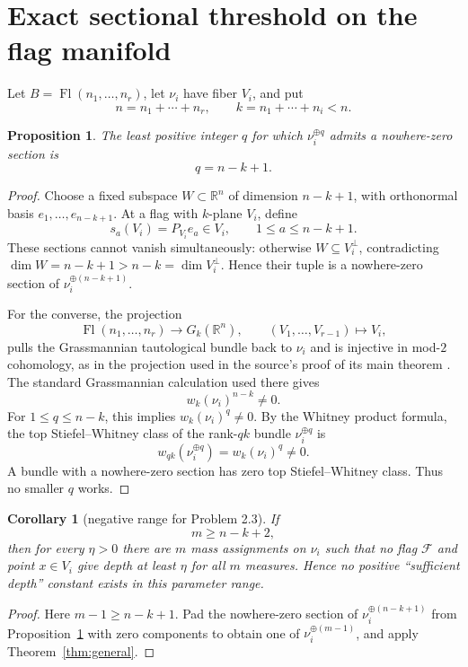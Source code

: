 \documentclass[11pt]{article}
\newtheorem{proposition}{Proposition}
\newtheorem{corollary}{Corollary}
\newcommand{\R}{\mathbb R}
\newcommand{\Fl}{\operatorname{Fl}}
\begin{document}
\section{Exact sectional threshold on the flag manifold}

Let $B=\Fl(n_1,\ldots,n_r)$, let $\nu_i$ have fiber $V_i$, and put
\[
 n=n_1+\cdots+n_r,
 \qquad k=n_1+\cdots+n_i<n.
\]

\begin{proposition}\label{prop:threshold}
The least positive integer $q$ for which $\nu_i^{\oplus q}$ admits a
nowhere-zero section is
\[
 q=n-k+1.
\]
\end{proposition}

\begin{proof}
Choose a fixed subspace $W\subset\R^n$ of dimension $n-k+1$, with orthonormal
basis $e_1,\ldots,e_{n-k+1}$.  At a flag with $k$-plane $V_i$, define
\[
 s_a(V_i)=P_{V_i}e_a\in V_i,
 \qquad 1\leq a\leq n-k+1.
\]
These sections cannot vanish simultaneously: otherwise
$W\subseteq V_i^\perp$, contradicting
$\dim W=n-k+1>n-k=\dim V_i^\perp$.  Hence their tuple is a nowhere-zero
section of $\nu_i^{\oplus(n-k+1)}$.

For the converse, the projection
\[
 \Fl(n_1,\ldots,n_r)\longrightarrow G_k(\R^n),
 \qquad (V_1,\ldots,V_{r-1})\longmapsto V_i,
\]
pulls the Grassmannian tautological bundle back to $\nu_i$ and is injective in
mod-$2$ cohomology, as in the projection used in the source's proof of its
main theorem \cite[Section 3]{source}.  The standard Grassmannian calculation
used there gives
\[
 w_k(\nu_i)^{n-k}\neq0.
\]
For $1\leq q\leq n-k$, this implies $w_k(\nu_i)^q\neq0$.  By the Whitney
product formula, the top Stiefel--Whitney class of the rank-$qk$ bundle
$\nu_i^{\oplus q}$ is
\[
 w_{qk}(\nu_i^{\oplus q})=w_k(\nu_i)^q\neq0.
\]
A bundle with a nowhere-zero section has zero top Stiefel--Whitney class.
Thus no smaller $q$ works.
\end{proof}

\begin{corollary}[negative range for Problem 2.3]\label{cor:flag}
If
\[
 \boxed{\qquad m\geq n-k+2,\qquad}
\]
then for every $\eta>0$ there are $m$ mass assignments on $\nu_i$ such that
no flag $\mathcal F$ and point $x\in V_i$ give depth at least $\eta$ for all
$m$ measures.  Hence no positive ``sufficient depth'' constant exists in this
parameter range.
\end{corollary}

\begin{proof}
Here $m-1\geq n-k+1$.  Pad the nowhere-zero section of
$\nu_i^{\oplus(n-k+1)}$ from Proposition~\ref{prop:threshold} with zero
components to obtain one of $\nu_i^{\oplus(m-1)}$, and apply
Theorem~\ref{thm:general}.
\end{proof}
\end{document}

